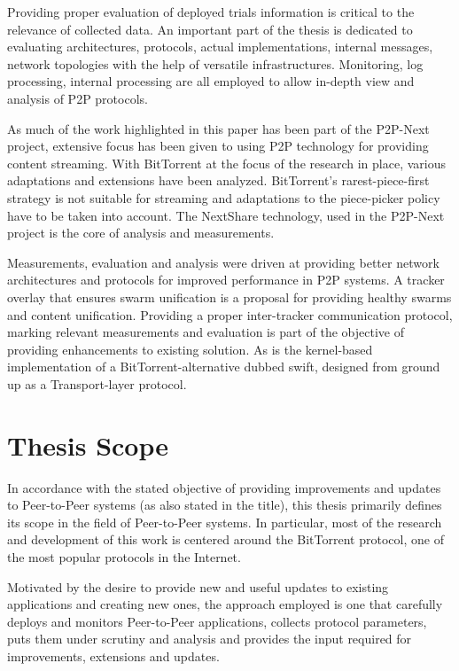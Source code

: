 Providing proper evaluation of deployed trials information is critical to the
relevance of collected data. An important part of the thesis is dedicated to
evaluating architectures, protocols, actual implementations, internal
messages, network topologies with the help of versatile infrastructures.
Monitoring, log processing, internal processing are all employed to allow
in-depth view and analysis of P2P protocols.

As much of the work highlighted in this paper has been part of the
P2P-Next project, extensive focus has been given to using P2P technology for
providing content streaming. With BitTorrent at the focus of the research in
place, various adaptations and extensions have been analyzed. BitTorrent's
rarest-piece-first strategy is not suitable for streaming and adaptations to
the piece-picker policy have to be taken into account. The NextShare
technology, used in the P2P-Next project is the core of analysis and
measurements.

Measurements, evaluation and analysis were driven at providing better network
architectures and protocols for improved performance in P2P systems. A tracker
overlay that ensures swarm unification is a proposal for providing healthy
swarms and content unification. Providing a proper inter-tracker communication
protocol, marking relevant measurements and evaluation is part of the objective
of providing enhancements to existing solution. As is the kernel-based
implementation of a BitTorrent-alternative dubbed swift, designed from ground
up as a Transport-layer protocol.

\section{Thesis Scope}
\label{sec:intro:scope}

In accordance with the stated objective of providing improvements and updates
to Peer-to-Peer systems (as also stated in the title), this thesis primarily
defines its scope in the field of Peer-to-Peer systems. In particular, most of
the research and development of this work is centered around the BitTorrent
protocol, one of the most popular protocols in the Internet.

Motivated by the desire to provide new and useful updates to existing
applications and creating new ones, the approach employed is one that
carefully deploys and monitors Peer-to-Peer applications, collects protocol
parameters, puts them under scrutiny and analysis and provides the input
required for improvements, extensions and updates.

